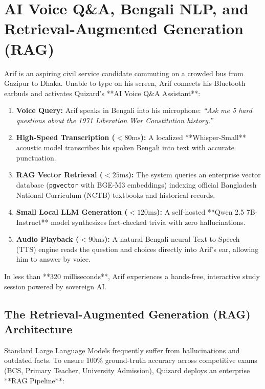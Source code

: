 \chapter{AI Voice Q\&A, Bengali NLP, and Retrieval-Augmented Generation (RAG)}

\begin{tcolorbox}[storybox, title={The Story of Arif's Voice-Guided BCS Revision}]
Arif is an aspiring civil service candidate commuting on a crowded bus from Gazipur to Dhaka. Unable to type on his screen, Arif connects his Bluetooth earbuds and activates Quizard's **AI Voice Q\&A Assistant**:

\begin{enumerate}
    \item \textbf{Voice Query:} Arif speaks in Bengali into his microphone: \textit{``Ask me 5 hard questions about the 1971 Liberation War Constitution history.''}
    \item \textbf{High-Speed Transcription ($< 80\text{ms}$):} A localized **Whisper-Small** acoustic model transcribes his spoken Bengali into text with accurate punctuation.
    \item \textbf{RAG Vector Retrieval ($< 25\text{ms}$):} The system queries an enterprise vector database (\texttt{pgvector} with BGE-M3 embeddings) indexing official Bangladesh National Curriculum (NCTB) textbooks and historical records.
    \item \textbf{Small Local LLM Generation ($< 120\text{ms}$):} A self-hosted **Qwen 2.5 7B-Instruct** model synthesizes fact-checked trivia with zero hallucinations.
    \item \textbf{Audio Playback ($< 90\text{ms}$):} A natural Bengali neural Text-to-Speech (TTS) engine reads the question and choices directly into Arif's ear, allowing him to answer by voice.
\end{enumerate}
In less than **320 milliseconds**, Arif experiences a hands-free, interactive study session powered by sovereign AI.
\end{tcolorbox}

\section{The Retrieval-Augmented Generation (RAG) Architecture}
Standard Large Language Models frequently suffer from hallucinations and outdated facts. To ensure 100\% ground-truth accuracy across competitive exams (BCS, Primary Teacher, University Admission), Quizard deploys an enterprise **RAG Pipeline**:


